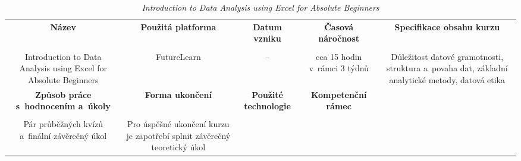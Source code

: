\begin{landscape}

\begin{table}[htbp]

\renewcommand\thetable{8}

\caption{\textit{Introduction to Data Analysis using Excel for Absolute Beginners}}\label{tab8}

\footnotesize

{

\justifying

\begin{tabularx}{\linewidth}{CCCCC}

\toprule

\textbf{Název} &

\textbf{Použitá platforma} &

\textbf{Datum vzniku} &

\textbf{Časová náročnost} &
 
\textbf{Specifikace obsahu kurzu}

\\

\tabularnewline
\midrule

Introduction to Data Analysis using Excel for Absolute Beginners

&

FutureLearn

&

–

&

cca 15 hodin v~rámci 3 týdnů

&

Důležitost datové gramotnosti, struktura a~povaha dat, základní analytické metody, datová etika

\\
\toprule

\textbf{Způsob práce s~hodnocením a~úkoly} &

\textbf{Forma ukončení} &

\textbf{Použité technologie} &

\textbf{Kompetenční rámec} 

\\

\tabularnewline
\midrule

Pár průběžných kvízů a~finální závěrečný úkol    

&

Pro úspěšné ukončení kurzu je zapotřebí splnit závěrečný teoretický úkol

&


\end{tabularx}}
\end{table}
\end{landscape}
